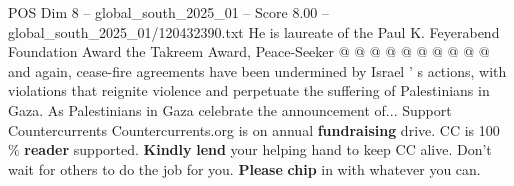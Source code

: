 \begin{textsample}{POS Dim 8 – global\_south\_2025\_01 – Score 8.00 – global\_south\_2025\_01/120432390.txt}
He is laureate of the Paul K.
Feyerabend Foundation Award the Takreem Award, Peace-Seeker @ @ @ @ @ @ @ @ @ @ and again, cease-fire agreements have been undermined by Israel ' s actions, with violations that reignite violence and perpetuate the suffering of Palestinians in Gaza.
As Palestinians in Gaza celebrate the announcement of...
Support Countercurrents Countercurrents.org is on annual \textbf{fundraising} drive.
CC is 100 \% \textbf{reader} supported. \textbf{Kindly} \textbf{lend} your helping hand to keep CC alive.
Don't wait for others to do the job for you. \textbf{Please} \textbf{chip} in with whatever you can.

\end{textsample}
